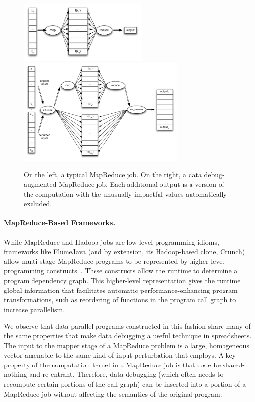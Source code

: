 \begin{figure}[t]
	\includegraphics[width=2.5in]{images/mapreduce}
  \hfill
	\includegraphics[width=3.25in]{images/mapreduce_dd}
	\caption{
		On the left, a typical MapReduce job.  On the right, a data debug-augmented MapReduce job.  Each additional output is a version of the computation with the unusually impactful values automatically excluded.\label{fig:mapreduce_pipeline}
	}
\end{figure}

\paragraph{MapReduce-Based Frameworks.}
While MapReduce and Hadoop jobs are low-level programming idioms,
frameworks like FlumeJava (and by extension, its Hadoop-based clone, Crunch)
allow multi-stage MapReduce programs to be represented by higher-level
programming constructs~\cite{pldi:flumejava}.  These constructs allow
the runtime to determine a program dependency graph.  This
higher-level representation gives the runtime global information that
facilitates automatic performance-enhancing program transformations,
such as reordering of functions in the program call graph to increase
parallelism.

We observe that data-parallel programs constructed in this fashion
share many of the same properties that make data debugging a useful
technique in spreadsheets.  The input to the mapper stage of a
MapReduce problem is a large, homogeneous vector amenable to the same
kind of input perturbation that \checkcell{} employs.  A key property
of the computation kernel in a MapReduce job is that code be
shared-nothing and re-entrant. Therefore, data debugging (which often
needs to recompute certain portions of the call graph) can be inserted
into a portion of a MapReduce job without affecting the semantics of
the original program.

